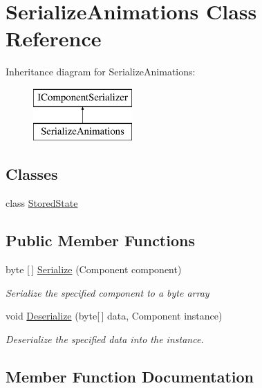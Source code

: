 \hypertarget{class_serialize_animations}{}\section{Serialize\+Animations Class Reference}
\label{class_serialize_animations}
Inheritance diagram for Serialize\+Animations\+:\begin{figure}[H]
\begin{center}
\leavevmode
\includegraphics[height=2.000000cm]{class_serialize_animations}
\end{center}
\end{figure}
\subsection*{Classes}
\begin{DoxyCompactItemize}
\item 
class \hyperlink{class_serialize_animations_1_1_stored_state}{Stored\+State}
\end{DoxyCompactItemize}
\subsection*{Public Member Functions}
\begin{DoxyCompactItemize}
\item 
byte \mbox{[}$\,$\mbox{]} \hyperlink{class_serialize_animations_a05552bb8c8baad409516f661845bc4e7}{Serialize} (Component component)
\begin{DoxyCompactList}\small\item\em Serialize the specified component to a byte array \end{DoxyCompactList}\item 
void \hyperlink{class_serialize_animations_a70a93ea3a6ce6289e19f0552565cebba}{Deserialize} (byte\mbox{[}$\,$\mbox{]} data, Component instance)
\begin{DoxyCompactList}\small\item\em Deserialize the specified data into the instance. \end{DoxyCompactList}\end{DoxyCompactItemize}


\subsection{Member Function Documentation}
\mbox{\label{class_serialize_animations_a70a93ea3a6ce6289e19f0552565cebba}} 
